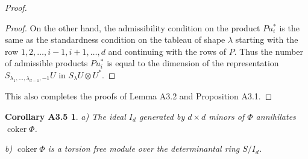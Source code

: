 \documentclass{tran-l}
\theoremstyle{plain}
\newtheorem*{theorem23}{Corollary A3.5}
\theoremstyle{remark}
\theoremstyle{definition}
\newcommand{\coker}{\operatorname{coker}}
\begin{document}
\begin{proof}
\begin{proof}
On the other hand, the admissibility condition on the product $P u_{i}^{*}$ is
the same as the standardness condition on the tableau of shape  $\lambda $
starting with the row $1,2,\ldots ,i-1,i+1,\ldots ,d$ and continuing with the
rows of $P$. Thus the number  of  admissible products $P u_{i}^{*}$ is equal to
the dimension of the representation  $S_{\lambda _{1},\ldots ,\lambda _{d-1},
-1}U$  in $S_{\lambda }U\otimes U^{*}$.   
\end{proof}

This also completes the proofs of Lemma A3.2 and Proposition A3.1.
\end{proof}


\begin{theorem23}
\textup{a)} The ideal $I_{d}$ generated by $d\times d$ minors
of $\Phi $ annihilates $\coker \Phi $.

\textup{b)} $\coker \Phi $ is a torsion free module over the determinantal
ring $S/I_{d}$.
\end{theorem23}
\end{document}
